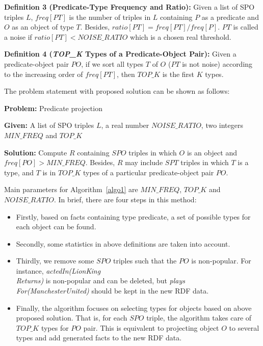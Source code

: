 \documentclass{acm_proc_article-sp}
\begin{document}
\textbf{Definition 3 (Predicate-Type Frequency and Ratio):} Given a list of SPO triples $L$, $freq[PT]$ is the number of triples in $L$ containing $P$ as a predicate and $O$ as an object of type $T$. Besides, $ratio[PT] = freq[PT] / freq[P]$. $PT$ is called a noise if $ratio[PT] < NOISE\_RATIO$ which is a chosen real threshold.

\textbf{Definition 4 (\textit{TOP\_K} Types of a Predicate-Object Pair):} Given a predicate-object pair $PO$, if we sort all types $T$ of $O$ ($PT$ is not noise) according to the increasing order of $freq[PT]$, then $TOP\_K$ is the first $K$ types.

The problem statement with proposed solution can be shown as follows:

\begin{framed}
\textbf{Problem:} Predicate projection

\textbf{Given:} A list of SPO triples $L$, a real number $NOISE\_RATIO$, two integers $MIN\_FREQ$ and $TOP\_K$

\textbf{Solution:} Compute $R$ containing $SPO$ triples in which $O$ is an object and $freq[PO] > MIN\_FREQ$. Besides, $R$ may include $SPT$ triples in which $T$ is a type, and $T$ is in $TOP\_K$ types of a particular predicate-object pair $PO$.
\end{framed}

Main parameters for Algorithm~\ref{algo1} are $MIN\_FREQ$, $TOP\_K$ and $NOISE\_RATIO$. In brief, there are four steps in this method:
\begin{itemize}
\item Firstly, based on facts containing type predicate, a set of possible types for each object can be found.
\item Secondly, some statistics in above definitions are taken into account.
\item Thirdly, we remove some $SPO$ triples such that the $PO$ is non-popular. For instance, \textit{actedIn(LionKing\\Returns)} is non-popular and can be deleted, but \textit{plays\\For(ManchesterUnited)} should be kept in the new RDF data.
\item Finally, the algorithm focuses on selecting types for objects based on above proposed solution. That is, for each $SPO$ triple, the algorithm takes care of $TOP\_K$ types for $PO$ pair. This is equivalent to projecting object $O$ to several types and add generated facts to the new RDF data.
\end{itemize}
\end{document}
